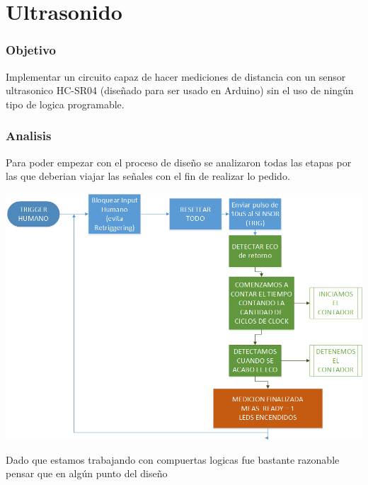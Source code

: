 \chapter{Ultrasonido}
\subsection{Objetivo}
Implementar un circuito capaz de hacer mediciones de distancia con un sensor ultrasonico HC-SR04 (diseñado para ser usado en Arduino) sin el uso de ningún tipo de logica programable.
\subsection{Analisis}
Para poder empezar con el proceso de diseño se analizaron todas las etapas por las que deberian viajar las señales con el fin de realizar lo pedido.
\begin{center}

\includegraphics[scale=0.5,keepaspectratio]{../8-UltraSound/Driagrama-de-Flujo.png}

\end{center}
Dado que estamos trabajando con compuertas logicas fue bastante razonable pensar que en algún punto del diseño
